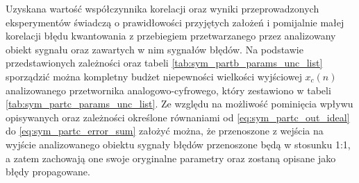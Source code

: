 Uzyskana wartość współczynnika korelacji oraz wyniki przeprowadzonych eksperymentów świadczą o prawidłowości przyjętych założeń i pomijalnie małej korelacji błędu kwantowania z przebiegiem przetwarzanego przez analizowany obiekt sygnału oraz zawartych w nim sygnałów błędów. Na podstawie przedstawionych zależności oraz tabeli \ref{tab:sym_partb_params_unc_list} sporządzić można kompletny budżet niepewności wielkości wyjściowej $x_{c}(n)$ analizowanego przetwornika analogowo-cyfrowego, który zestawiono w tabeli \ref{tab:sym_partc_params_unc_list}. Ze względu na możliwość pominięcia wpływu opisywanych oraz zależności określone równaniami od \eqref{eq:sym_partc_out_ideal} do \eqref{eq:sym_partc_error_sum} założyć można, że przenoszone z wejścia na wyjście analizowanego obiektu sygnały błędów przenoszone będą w stosunku 1:1, a zatem zachowają one swoje oryginalne parametry oraz zostaną opisane jako błędy propagowane.


